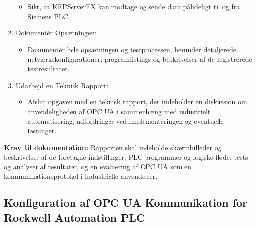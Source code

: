 \begin{enumerate}
\begin{itemize}
		\item Sikr, at KEPServerEX kan modtage og sende data pålideligt til og fra Siemens PLC.
	\end{itemize}
	\item Dokumentér Opsætningen:
	\begin{itemize}
		\item Dokumentér hele opsætningen og testprocessen, herunder detaljerede netværkskonfigurationer, programlistings og beskrivelser af de registrerede testresultater.
	\end{itemize}
	\item Udarbejd en Teknisk Rapport:
	\begin{itemize}
		\item Afslut opgaven med en teknisk rapport, der indeholder en diskussion om anvendeligheden af OPC UA i sammenhæng med industrielt automatisering, udfordringer ved implementeringen og eventuelle løsninger.
	\end{itemize}
\end{enumerate}
\textbf{Krav til dokumentation:} Rapporten skal indeholde skærmbilleder og beskrivelser af de foretagne indstillinger, PLC-programmer og logiske fløde, tests og analyser af resultater, og en evaluering af OPC UA som en kommunikationsprotokol i industrielle anvendelser.

\subsection*{Konfiguration af OPC UA Kommunikation for Rockwell Automation PLC}
\label{subsec:opc_ua_comm_rockwell}

